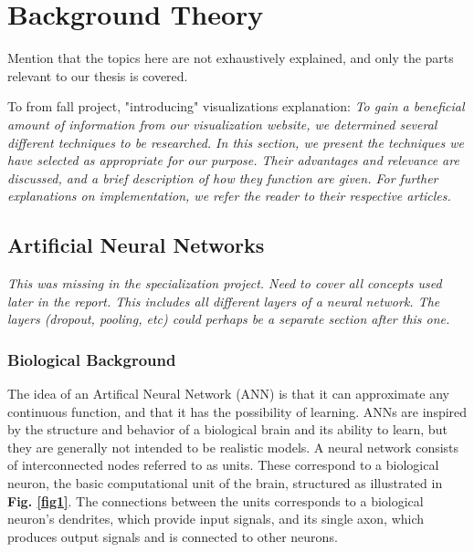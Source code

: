 
\chapter{Background Theory}

Mention that the topics here are not exhaustively explained, and only the parts relevant to our thesis is covered. 

To from fall project, "introducing" visualizations explanation:
\noindent \textit{To gain a beneficial amount of information from our visualization website, we determined several different techniques to be researched. In this section, we present the techniques we have selected as appropriate for our purpose. Their advantages and relevance are discussed, and a brief description of how they function are given. For further explanations on implementation, we refer the reader to their respective articles.}

\section{Artificial Neural Networks}

\textit{This was missing in the specialization project. Need to cover all concepts used later in the report. This includes all different layers of a neural network. The layers (dropout, pooling, etc) could perhaps be a separate section after this one.}

\subsection{Biological Background}

The idea of an Artifical Neural Network (ANN) is that it can approximate any continuous function, and that it has the possibility of learning. ANNs are inspired by the structure and behavior of a biological brain and its ability to learn, but they are generally not intended to be realistic models. A neural network consists of interconnected nodes referred to as units. These correspond to a biological neuron, the basic computational unit of the brain, structured as illustrated in \textbf{Fig. \ref{fig1}}. The connections between the units corresponds to a biological neuron's dendrites, which provide input signals, and its single axon, which produces output signals and is connected to other neurons. \\

